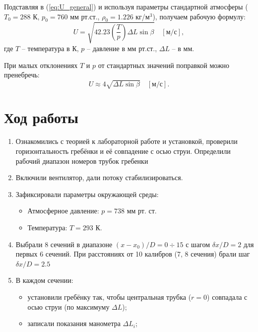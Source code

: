 \documentclass[12pt,a4paper]{article}
\begin{document}
Подставляя в (\ref{eq:U_general}) и используя параметры стандартной атмосферы ($T_0 = 288$ К, $p_0 = 760$ мм рт.ст., $\rho_0 = 1.226$ кг/м$^3$), получаем рабочую формулу:
\begin{equation}
U = \sqrt{42.23 \left( \frac{T}{p} \right) \Delta L \sin\beta} \quad [\text{м/с}],
\label{eq:U_full}
\end{equation}
где $T$ -- температура в К, $p$ -- давление в мм рт.ст., $\Delta L$ -- в мм.

При малых отклонениях $T$ и $p$ от стандартных значений поправкой можно пренебречь:
\begin{equation}
U \approx 4 \sqrt{\Delta L \sin\beta} \quad [\text{м/с}].
\label{eq:U_simplified}
\end{equation}


\section{Ход работы}
\begin{enumerate}
    \item Ознакомились с теорией к лабораторной работе и установкой, проверили горизонтальность гребёнки и её совпадение с осью струи. Определили рабочий диапазон номеров трубок гребенки
    
    \item Включили вентилятор, дали потоку стабилизироваться.
    
    \item Зафиксировали параметры окружающей среды:
    \begin{itemize}
        \item Атмосферное давление: $p = 738$ мм рт. ст.
        \item Температура: $T = 293$ К.
    \end{itemize}
    
    \item Выбрали 8 сечений в диапазоне $(x-x_0)/D = 0 \div 15$ с шагом $\delta x/D = 2$ для первых 6 сечений. При расстояниях от 10 калибров (7, 8 сечения) брали шаг $\delta x/D = 2.5$
    
    \item В каждом сечении:
    \begin{itemize}
        \item установили гребёнку так, чтобы центральная трубка ($r=0$) совпадала с осью струи (по максимуму $\Delta L$);
        \item записали показания манометра $\Delta L_i$;
    \end{itemize}
    
    \end{enumerate}
\end{document}
